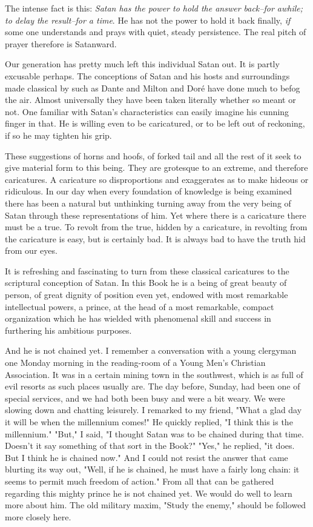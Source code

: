 The intense fact is this: \textit{Satan has the power to hold the answer
back--for awhile; to delay the result--for a time}. He has not the power
to hold it back finally, \textit{if} some one understands and prays with quiet,
steady persistence. The real pitch of prayer therefore is Satanward.

Our generation has pretty much left this individual Satan out. It is
partly excusable perhaps. The conceptions of Satan and his hosts and
surroundings made classical by such as Dante and Milton and Doré have
done much to befog the air. Almost universally they have been taken
literally whether so meant or not. One familiar with Satan's
characteristics can easily imagine his cunning finger in that. He is
willing even to be caricatured, or to be left out of reckoning, if so he
may tighten his grip.

These suggestions of horns and hoofs, of forked tail and all the rest of
it seek to give material form to this being. They are grotesque to an
extreme, and therefore caricatures. A caricature so disproportions and
exaggerates as to make hideous or ridiculous. In our day when every
foundation of knowledge is being examined there has been a natural but
unthinking turning away from the very being of Satan through these
representations of him. Yet where there is a caricature there must be a
true. To revolt from the true, hidden by a caricature, in revolting from
the caricature is easy, but is certainly bad. It is always bad to have the
truth hid from our eyes.

It is refreshing and fascinating to turn from these classical caricatures
to the scriptural conception of Satan. In this Book he is a being of great
beauty of person, of great dignity of position even yet, endowed with most
remarkable intellectual powers, a prince, at the head of a most
remarkable, compact organization which he has wielded with phenomenal
skill and success in furthering his ambitious purposes.

And he is not chained yet. I remember a conversation with a young
clergyman one Monday morning in the reading-room of a Young Men's
Christian Association. It was in a certain mining town in the southwest,
which is as full of evil resorts as such places usually are. The day
before, Sunday, had been one of special services, and we had both been
busy and were a bit weary. We were slowing down and chatting leisurely. I
remarked to my friend, "What a glad day it will be when the millennium
comes!" He quickly replied, "I think this is the millennium." "But," I
said, "I thought Satan was to be chained during that time. Doesn't it say
something of that sort in the Book?" "Yes," he replied, "it does. But I
think he is chained now." And I could not resist the answer that came
blurting its way out, "Well, if he is chained, he must have a fairly long
chain: it seems to permit much freedom of action." From all that can be
gathered regarding this mighty prince he is not chained yet. We would do
well to learn more about him. The old military maxim, "Study the enemy,"
should be followed more closely here.


